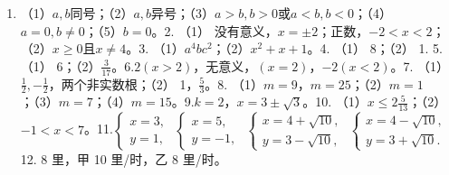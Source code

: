 \begin{enumerate}
\item
  （1）\(a, b\)同号；（2）\(a, b\)异号；（3）\(a > b, b > 0\)或\(a < b, b < 0\)；（4）\(a = 0, b \neq 0\)；（5）\(b = 0\)。2.
  （1）
  没有意义，\(x = \pm 2\)；正数，\(-2 < x < 2\)；（2）\(x \geqslant 0\)且\(x \neq 4\)。3.
  （1）\(a^4 bc^2\)；（2）\(x^2 + x + 1\)。4. （1） 8；（2） 1. 5. （1）
  6；（2）\(\frac{3}{17}\)。6.\(2(x > 2)\)，无意义，\((x = 2)\)，\(-2(x < 2)\)。7.
  （1）\(\frac{1}{2}, -\frac{1}{2}\)，两个非实数根；（2）
  1，\(\frac{5}{3}\)。8.
  （1）\(m = 9\)，\(m = 25\)；（2）\(m = 1\)；（3）\(m = 7\)；（4）\(m = 15\)。9.\(k = 2\)，\(x = 3 \pm \sqrt{3}\)。10.
  （1）\(x \leqslant 2\frac{5}{13}\)；（2）\(-1 < x < 7\)。11.\(\left\{ \begin{array}{l} x = 3, \\ y = 1, \end{array} \right.\) \(\left\{ \begin{array}{l} x = 5, \\ y = -1, \end{array} \right.\) \(\left\{ \begin{array}{l} x = 4 + \sqrt{10}, \\ y = 3 - \sqrt{10}, \end{array} \right.\) \(\left\{ \begin{array}{l} x = 4 - \sqrt{10}, \\ y = 3 + \sqrt{10}. \end{array} \right.\)
  12. 8 里，甲 10 里/时，乙 8 里/时。
\end{enumerate}
